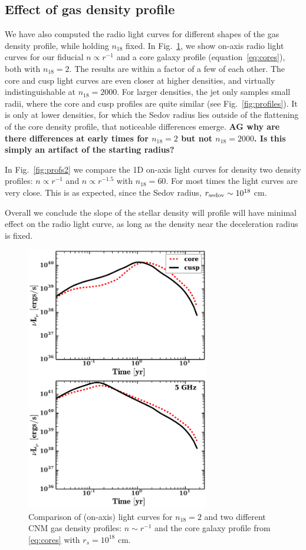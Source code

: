 \documentclass[usenatbib,fleqn]{mnras}
\begin{document}
\subsection{Effect of gas density profile}
\label{sec:profileComp}
We have also computed the radio light curves for different shapes of
the gas density profile, while holding $n_{18}$ fixed. In
Fig.~\ref{fig:cores}, we show on-axis radio light curves for our
fiducial $n\propto r^{-1}$ and a core galaxy profile
(equation~\ref{eq:cores}), both with $n_{18}=2$.
The results are within a factor of a few of each other. The core and
cusp light curves are even closer at higher densities, and virtually
indistinguishable at $n_{18}=2000$. For larger densities, the jet only
samples small radii, where the core and cusp profiles are quite
similar (see Fig.~\ref{fig:profiles}). It is only at lower densities,
for which the Sedov radius lies outside of the flattening of the core
density profile, that noticeable differences emerge. {\bf AG why are
  there differences at early times for $n_{18}=2$ but not
  $n_{18}=2000$. Is this simply an artifact of the starting radius?}

In Fig.~\ref{fig:profs2} we compare the 1D on-axis light curves for
density two density profiles: $n\propto r^{-1}$ and $n\propto r^{-1.5}$
with $n_{18}=60$. For most times the light curves are very close.
This is as expected, since the Sedov radius, $r_{\rm sedov}\sim
10^{18}$ cm. 

Overall we conclude the slope of the stellar density will profile will
have minimal effect on the radio light curve, as long as the density
near the deceleration radius is fixed. 

\begin{figure} 
  \includegraphics[width=8cm]{fig_cores.pdf}
  \caption{\label{fig:cores} Comparison of (on-axis) light curves for
    $n_{18}=2$ and two different CNM gas density profiles: $n\sim
    r^{-1}$ and the core galaxy profile from \eqref{eq:cores} with
    $r_s=10^{18}$ cm.}
\end{figure}
\end{document}

